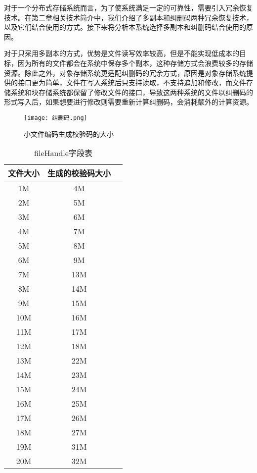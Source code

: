 对于一个分布式存储系统而言，为了使系统满足一定的可靠性，需要引入冗余恢复技术。在第二章相关技术简介中，我们介绍了多副本和纠删码两种冗余恢复技术，以及它们结合使用的方式。接下来将分析本系统选择多副本和纠删码结合使用的原因。

对于只采用多副本的方式，优势是文件读写效率较高，但是不能实现低成本的目标，因为所有的文件都会在系统中保存多个副本，这种存储方式会浪费较多的存储资源。除此之外，对象存储系统更适配纠删码的冗余方式，原因是对象存储系统提供的接口更为简单，文件在写入系统后只支持读取，不支持追加和修改，而文件存储系统和块存储系统都保留了修改文件的接口，导致这两种系统的文件以纠删码的形式写入后，如果想要进行修改则需要重新计算纠删码，会消耗额外的计算资源。

\begin{figure}[h]
  \centering
  \texttt{[image: 纠删码.png]}
  \caption{小文件编码生成校验码的大小}
\end{figure}

\begin{table}[h]
  \centering
  \caption{fileHandle字段表}
  \begin{tabular}{ccc}
    \toprule
    文件大小     & 生成的校验码大小 \\
    \midrule
    1M & 4M                     \\
    2M & 5M                     \\
    3M & 6M                     \\
    4M & 7M                     \\
    5M & 8M                     \\
    6M & 9M                     \\
    7M & 13M                     \\
    8M & 14M                     \\
    9M & 15M                     \\
    10M & 16M                     \\
    11M & 17M                     \\
    12M & 18M                     \\
    13M & 22M                     \\
    14M & 23M                     \\
    15M & 24M                     \\
    16M & 25M                     \\
    17M & 26M                     \\
    18M & 27M                     \\
    19M & 31M                     \\
    20M & 32M                     \\
    \bottomrule
  \end{tabular}
\end{table}

